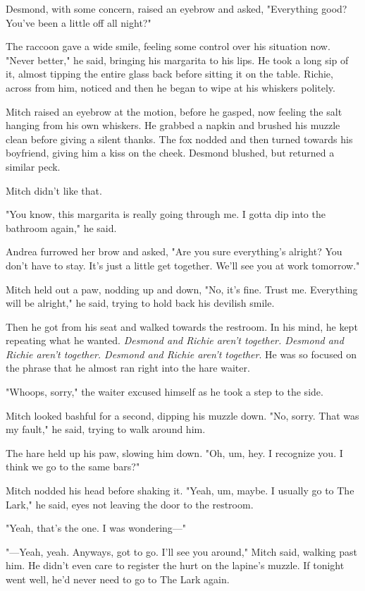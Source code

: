 Desmond, with some concern, raised an eyebrow and asked, "Everything good? You've been a little off all night?"

The raccoon gave a wide smile, feeling some control over his situation now. "Never better," he said, bringing his margarita to his lips. He took a long sip of it, almost tipping the entire glass back before sitting it on the table. Richie, across from him, noticed and then he began to wipe at his whiskers politely.

Mitch raised an eyebrow at the motion, before he gasped, now feeling the salt hanging from his own whiskers. He grabbed a napkin and brushed his muzzle clean before giving a silent thanks. The fox nodded and then turned towards his boyfriend, giving him a kiss on the cheek. Desmond blushed, but returned a similar peck.

Mitch didn't like that.

"You know, this margarita is really going through me. I gotta dip into the bathroom again," he said.

Andrea furrowed her brow and asked, "Are you sure everything's alright? You don't have to stay. It's just a little get together. We'll see you at work tomorrow."

Mitch held out a paw, nodding up and down, "No, it's fine. Trust me. Everything will be alright," he said, trying to hold back his devilish smile.

Then he got from his seat and walked towards the restroom. In his mind, he kept repeating what he wanted. \emph{Desmond and Richie aren't together. Desmond and Richie aren't together. Desmond and Richie aren't together}. He was so focused on the phrase that he almost ran right into the hare waiter.

"Whoops, sorry," the waiter excused himself as he took a step to the side.

Mitch looked bashful for a second, dipping his muzzle down. "No, sorry. That was my fault," he said, trying to walk around him.

The hare held up his paw, slowing him down. "Oh, um, hey. I recognize you. I think we go to the same bars?"

Mitch nodded his head before shaking it. "Yeah, um, maybe. I usually go to The Lark," he said, eyes not leaving the door to the restroom.

"Yeah, that's the one. I was wondering---"

"---Yeah, yeah. Anyways, got to go. I'll see you around," Mitch said, walking past him. He didn't even care to register the hurt on the lapine's muzzle. If tonight went well, he'd never need to go to The Lark again.

